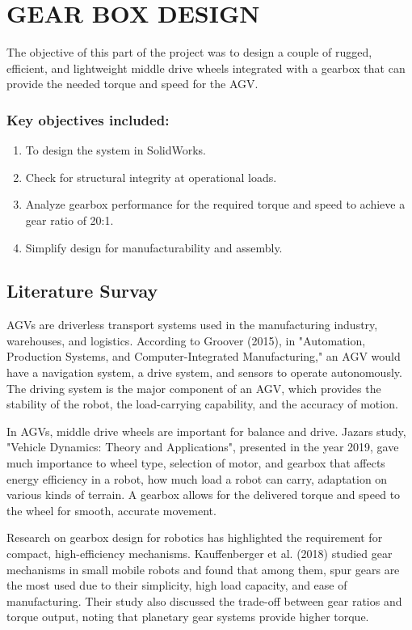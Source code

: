 \documentclass[../../main]{subfiles}
\begin{document}
\chapter{GEAR BOX DESIGN}


The objective of this part of the project was to design a couple of
rugged, efficient, and lightweight middle drive wheels integrated with a
gearbox that can provide the needed torque and speed for the AGV.

\subsection*{Key objectives included:}

\begin{enumerate}
\def\labelenumi{\arabic{enumi}.}
\item
  To design the system in SolidWorks.
\item
  Check for structural integrity at operational loads.
\item
  Analyze gearbox performance for the required torque and speed to
  achieve a gear ratio of 20:1.
\item
  Simplify design for manufacturability and assembly.
\end{enumerate}

\section{Literature Survay}

AGVs are driverless transport systems used in the manufacturing
industry, warehouses, and logistics. According to Groover (2015), in
"Automation, Production Systems, and Computer-Integrated Manufacturing,"
an AGV would have a navigation system, a drive system, and sensors to
operate autonomously. The driving system is the major component of an
AGV, which provides the stability of the robot, the load-carrying
capability, and the accuracy of motion.

In AGVs, middle drive wheels are important for balance and drive.
Jazar\textquotesingle s study, "Vehicle Dynamics: Theory and
Applications", presented in the year 2019, gave much importance to wheel
type, selection of motor, and gearbox that affects energy efficiency in
a robot, how much load a robot can carry, adaptation on various kinds of
terrain. A gearbox allows for the delivered torque and speed to the
wheel for smooth, accurate movement.

Research on gearbox design for robotics has highlighted the requirement
for compact, high-efficiency mechanisms. Kauffenberger et al. (2018)
studied gear mechanisms in small mobile robots and found that among
them, spur gears are the most used due to their simplicity, high load
capacity, and ease of manufacturing. Their study also discussed the
trade-off between gear ratios and torque output, noting that planetary
gear systems provide higher torque.
\end{document}
